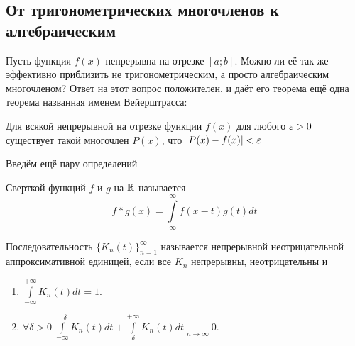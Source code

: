 \subsection{От тригонометрических многочленов к алгебраическим}
Пусть функция $f(x)$ непрерывна на отрезке $[a;b]$. Можно ли её так же эффективно приблизить не тригонометрическим, а просто алгебраическим многочленом? Ответ на этот вопрос положителен, и даёт его теорема ещё одна теорема названная именем Вейерштрасса:
\begin{Theorem}[Вейерштрасс]
	Для всякой непрерывной на отрезке функции $f(x)$ для любого $\varepsilon > 0$ существует такой многочлен $P(x)$, что $|P(x) - f(x)| < \varepsilon$
\end{Theorem}
Введём ещё пару определений
\begin{Def}
	Сверткой функций $f$ и $g$ на $\mathbb{R}$ называется
	$$
		f*g(x) = \int\limits_{\infty}^{\infty} f(x-t)g(t) dt
	$$
\end{Def}
\begin{Def}
	Последовательность $\{K_n(t)\}_{n=1}^{\infty}$ называется непрерывной неотрицательной аппроксимативной единицей, если все $K_n$ непрерывны, неотрицательны и
	\begin{enumerate}
		\item $\int\limits_{-\infty}^{+\infty}K_n(t) dt = 1$.
		\item $\forall \delta > 0 \; \int\limits_{-\infty}^{-\delta}K_n(t)dt + \int\limits_{\delta}^{+\infty}K_n(t) dt \underset{n \to \infty}{\longrightarrow}0$.
	\end{enumerate}
\end{Def}
